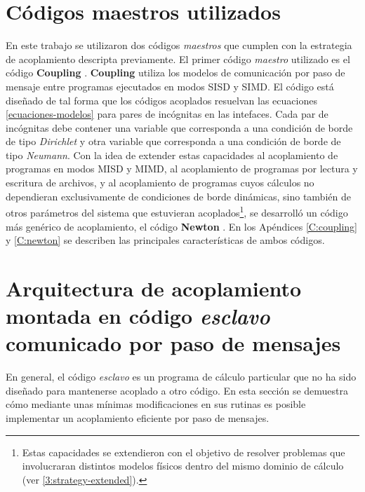 \section{Códigos maestros utilizados}
\label{2:maestros}

En este trabajo se utilizaron dos códigos \textit{maestros} que cumplen con la estrategia de acoplamiento descripta previamente.
El primer código \textit{maestro} utilizado es el código \textbf{Coupling} \cite{coup-0d3d} \cite{coup-black} \cite{coup-hyd}.
\textbf{Coupling} utiliza los modelos de comunicación por paso de mensaje entre programas ejecutados en modos SISD y SIMD.
El código está diseñado de tal forma que los códigos acoplados resuelvan las ecuaciones \ref{ecuaciones-modelos}
para pares de incógnitas en las intefaces. 
Cada par de incógnitas debe contener una variable que corresponda a una condición de borde de tipo \textit{Dirichlet} y otra variable que corresponda a una condición de borde de tipo \textit{Neumann}.
Con la idea de extender estas capacidades al acoplamiento de programas en modos MISD y MIMD,
al acoplamiento de programas por lectura y escritura de archivos,
y al acoplamiento de programas cuyos cálculos no dependieran exclusivamente de condiciones de borde dinámicas,
sino también de otros parámetros del sistema que estuvieran acoplados\footnote{
Estas capacidades se extendieron con el objetivo de resolver problemas que involucraran distintos modelos físicos dentro del mismo dominio de cálculo (ver \ref{3:strategy-extended}).
},
se desarrolló un código más genérico de acoplamiento, el código \textbf{Newton} \cite{newton}.
En los Apéndices \ref{C:coupling} y \ref{C:newton} se describen las principales características de ambos códigos.

\section{Arquitectura de acoplamiento montada en código \textit{esclavo} comunicado por paso de mensajes}
\label{2:arquitectura-mpi}

En general, el código \textit{esclavo} es un programa de cálculo particular que no ha sido diseñado para mantenerse acoplado a otro código.
En esta sección se demuestra cómo mediante unas mínimas modificaciones en sus rutinas es posible implementar un acoplamiento eficiente por paso de mensajes.

